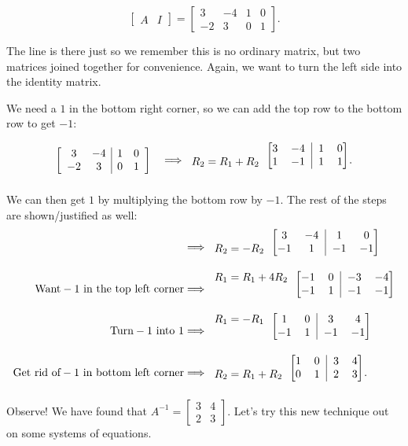 \documentclass[../gatm.tex]{subfiles}
\begin{document}
$$\left[\begin{array}{c|c}A & I \end{array}\right] = \left[\begin{array}{cc|cc} 3 & -4 & 1 & 0 \\ -2 & 3 & 0 & 1 \end{array}\right].$$

The line is there just so we remember this is no ordinary matrix, but two matrices joined together for convenience. Again, we want to turn the left side into the identity matrix.

We need a $1$ in the bottom right corner, so we can add the top row to the bottom row to get $-1$:

$$\left[\begin{array}{cc|cc} 3 & -4 & 1 & 0 \\ -2 & 3 & 0 & 1 \end{array}\right]\quad\Longrightarrow
\begin{blockarray}{c[cc|cc]}
& 3 & -4 & 1 & 0 \\
R_2=R_1+R_2 & 1 & -1 & 1 & 1
\end{blockarray}.$$

We can then get $1$ by multiplying the bottom row by $-1$. The rest of the steps are shown/justified as well:
\begin{align*}
&\Longrightarrow
\begin{blockarray}{c[cc|cc]}
& 3 & -4 & 1 & 0 \\
R_2=-R_2 & -1 & 1 & -1 & -1
\end{blockarray} \\
\text{Want}-1\text{ in the top left corner} &\Longrightarrow
\begin{blockarray}{c[cc|cc]}
R_1=R_1+4R_2 & -1 & 0 & -3 & -4 \\
& -1 & 1 & -1 & -1
\end{blockarray} \\
\text{Turn}-1\text{ into }1 &\Longrightarrow
\begin{blockarray}{c[cc|cc]}
R_1=-R_1 & 1 & 0 & 3 & 4 \\
& -1 & 1 & -1 & -1
\end{blockarray} \\
\text{Get rid of}-1\text{ in bottom left corner}&\Longrightarrow
\begin{blockarray}{c[cc|cc]}
& 1 & 0 & 3 & 4 \\
R_2=R_1+R_2 & 0 & 1 & 2 & 3
\end{blockarray}. \\
\end{align*}
Observe! We have found that $A^{-1}=\left[\begin{smallmatrix}3 & 4 \\ 2 & 3 \end{smallmatrix}\right]$. Let's try this new technique out on some systems of equations.
\end{document}
